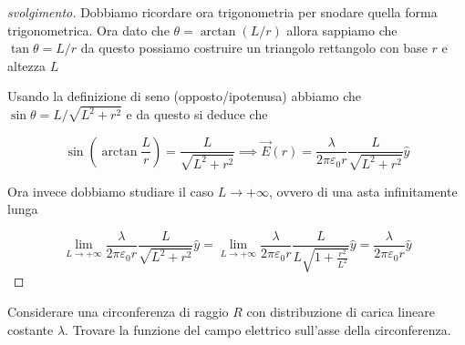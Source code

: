 \documentclass{rapport}
\begin{document}
\begin{proof}[svolgimento]
Dobbiamo ricordare ora trigonometria per snodare quella forma trigonometrica. Ora dato che $\theta=\arctan(L/r)$ allora sappiamo che $\tan\theta = L/r$ da questo possiamo costruire un triangolo rettangolo con base $r$ e altezza $L$

\begin{center}
  
\end{center}


Usando la definizione di seno (opposto/ipotenusa) abbiamo che $\sin\theta=L/\sqrt{L^2+r^2}$ e da questo si deduce che 

\[
\sin\left(\arctan\dfrac{L}{r}\right) = \dfrac{L}{\sqrt{L^2+r^2}} \implies \vec{E}(r) =  \dfrac{\lambda  }{2\pi\varepsilon_0 r}   \dfrac{L}{\sqrt{L^2+r^2}} \hat{y}
\]


Ora invece dobbiamo studiare il caso $L\to+\infty$, ovvero di una asta infinitamente lunga

\[
\lim_{L\to +\infty} \dfrac{\lambda  }{2\pi\varepsilon_0 r}   \dfrac{L}{\sqrt{L^2+r^2}} \hat{y} = \lim_{L\to +\infty} \dfrac{\lambda  }{2\pi\varepsilon_0 r}   \dfrac{L}{L\sqrt{1+\frac{r^2}{L^2}}} \hat{y} =  \dfrac{\lambda  }{2\pi\varepsilon_0 r}   \hat{y} 
\]
\end{proof}




\newpage

\begin{esercizio}{}{}
  Considerare una circonferenza di raggio $R$ con distribuzione di carica lineare costante $\lambda$. Trovare la funzione del campo elettrico sull'asse della circonferenza.
\end{esercizio}
\end{document}
